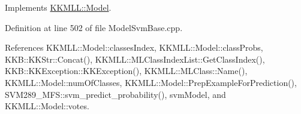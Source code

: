 Implements \hyperlink{class_k_k_m_l_l_1_1_model_a7d67e85653e0bf4e60f20e5127fa97a2}{K\+K\+M\+L\+L\+::\+Model}.



Definition at line 502 of file Model\+Svm\+Base.\+cpp.



References K\+K\+M\+L\+L\+::\+Model\+::classes\+Index, K\+K\+M\+L\+L\+::\+Model\+::class\+Probs, K\+K\+B\+::\+K\+K\+Str\+::\+Concat(), K\+K\+M\+L\+L\+::\+M\+L\+Class\+Index\+List\+::\+Get\+Class\+Index(), K\+K\+B\+::\+K\+K\+Exception\+::\+K\+K\+Exception(), K\+K\+M\+L\+L\+::\+M\+L\+Class\+::\+Name(), K\+K\+M\+L\+L\+::\+Model\+::num\+Of\+Classes, K\+K\+M\+L\+L\+::\+Model\+::\+Prep\+Example\+For\+Prediction(), S\+V\+M289\+\_\+\+M\+F\+S\+::svm\+\_\+predict\+\_\+probability(), svm\+Model, and K\+K\+M\+L\+L\+::\+Model\+::votes.


